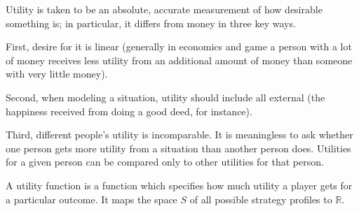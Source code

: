 \documentclass[12pt]{article}
\begin{document}
Utility is taken to be an absolute, accurate measurement of how desirable something is; in particular, it differs from money in three key ways.

First, desire for it is linear (generally in economics and game  a person with a lot of money receives less utility from an additional  amount of money than someone with very little money).

Second, when modeling a  situation, utility should include all external  (the happiness received from doing a good deed, for instance).

Third, different people's utility is incomparable.  It is meaningless to ask whether one person gets more utility from a situation than another person does.  Utilities for a given person can be compared only to other utilities for that person.

A utility function is a function which specifies how much utility a player gets for a particular outcome.  It maps the space $S$ of all possible strategy profiles to $\mathbb{R}$.
\end{document}
